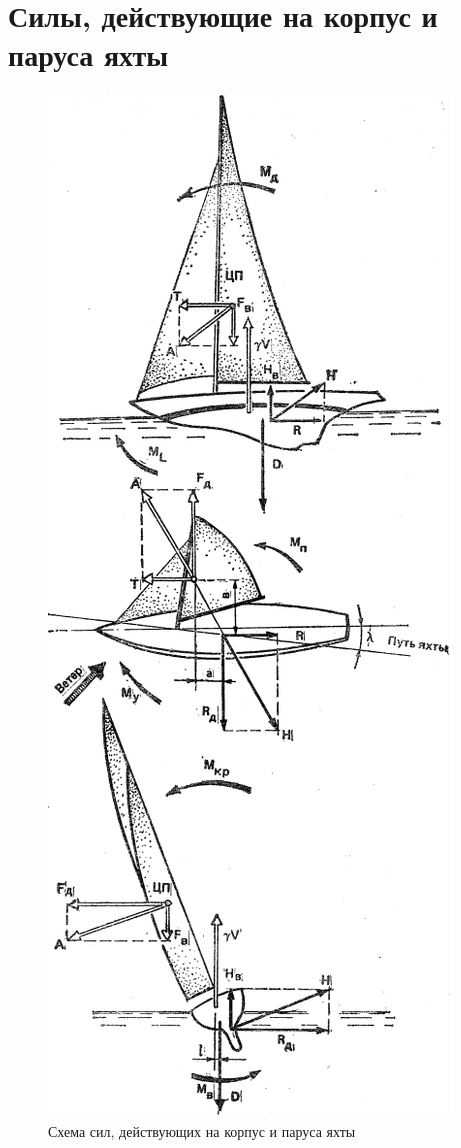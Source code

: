 \documentclass[a4paper, 12pt, twoside, final, book, russian, fittopage, cyremdash]{ncc}
\begin{document}
\section{Силы, действующие на корпус и паруса яхты}

\begin{figure}[htb]
  \centering\includegraphics[scale=0.9]{0004P.pdf}
  \caption{\centering{} Схема сил, действующих на корпус и паруса яхты}
  \label{fig:4}
\end{figure}
\end{document}
